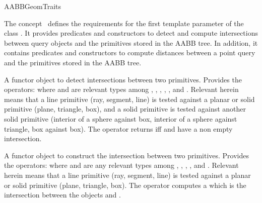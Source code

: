 \ccRefPageBegin


\begin{ccRefConcept}{AABBGeomTraits}


\ccDefinition
  
The concept \ccRefName\ defines the requirements for the first template parameter of the class . It provides predicates and constructors to detect and compute intersections between query objects and the primitives stored in the AABB tree. In addition, it contains  predicates and constructors to compute distances between a point query and the primitives stored in the AABB tree.

\ccTypes


{A functor object to detect intersections between two primitives.
Provides the operators:
where  and  are relevant types
among , , , , ,  and . Relevant herein means that a line primitive (ray, segment, line) is tested against a planar or solid primitive (plane, triangle, box), and a solid primitive is tested against another solid primitive (interior of a sphere against box, interior of a sphere against triangle, box against box). The operator returns  iff  and  have a non empty intersection.}

{A functor object to construct the intersection between two primitives.
Provides the operators:
 where  and  are any relevant types among , , ,  ,  and . Relevant herein means that a line primitive (ray, segment, line) is tested against a planar or solid primitive (plane, triangle, box). The operator computes a  which is the intersection between the objects  and .}


\end{ccRefConcept}
